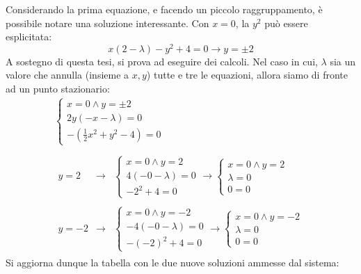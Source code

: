 \documentclass[a4paper]{article}
\begin{document}
	\noindent
	Considerando la prima equazione, e facendo un piccolo raggruppamento, è possibile notare una soluzione interessante. Con $x = 0$, la $y^{2}$ può essere esplicitata:
	\begin{equation*}
		x\left(2-\lambda\right) - y^{2} + 4 = 0 \longrightarrow y = \pm 2
	\end{equation*}
	A sostegno di questa tesi, si prova ad eseguire dei calcoli. Nel caso in cui, $\lambda$ sia un valore che annulla (insieme a $x,y$) tutte e tre le equazioni, allora siamo di fronte ad un punto stazionario:
	\begin{gather*}
		\begin{cases}
			x = 0 \land y = \pm 2 \\
			2y\left(-x-\lambda\right) = 0 \\
			-\left(\frac{1}{2}x^{2} + y^{2} - 4\right) = 0
		\end{cases} \\
		\\
		\begin{array}{rcl}
			y = 2 &\rightarrow& \begin{cases}
				x = 0 \land y = 2 \\
				4\left(-0 - \lambda\right) = 0 \\
				-2^{2} + 4 = 0
			\end{cases}
			\rightarrow
			\begin{cases}
				x = 0 \land y = 2 \\
				\lambda = 0 \\
				0 = 0
			\end{cases} \\
			\\
			y = -2 &\rightarrow& \begin{cases}
				x = 0 \land y = -2 \\
				-4\left(-0 - \lambda\right) = 0 \\
				-\left(-2\right)^{2} + 4 = 0
			\end{cases}
			\rightarrow
			\begin{cases}
				x = 0 \land y = -2 \\
				\lambda = 0 \\
				0 = 0
			\end{cases}
		\end{array}
	\end{gather*}
	Si aggiorna dunque la tabella con le due nuove soluzioni ammesse dal sistema:
\end{document}
